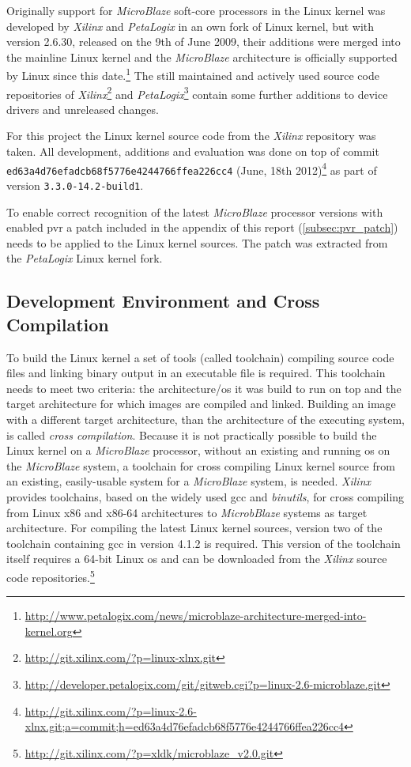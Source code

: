 Originally support for \textit{MicroBlaze} soft-core processors in the Linux kernel was developed by \textit{Xilinx} and \textit{PetaLogix} in an own fork of Linux kernel, but with version 2.6.30, released on the 9th of June 2009, their additions were merged into the mainline Linux kernel and the \textit{MicroBlaze} architecture is officially supported by Linux since this date.\footnote{\url{http://www.petalogix.com/news/microblaze-architecture-merged-into-kernel.org}} The still maintained and actively used source code repositories of \textit{Xilinx}\footnote{\url{http://git.xilinx.com/?p=linux-xlnx.git}} and \textit{PetaLogix}\footnote{\url{http://developer.petalogix.com/git/gitweb.cgi?p=linux-2.6-microblaze.git}} contain some further additions to device drivers and unreleased changes.

For this project the Linux kernel source code from the \textit{Xilinx} repository was taken. All development, additions and evaluation was done on top of commit \texttt{ed63a4d76efadcb68f5776e4244766ffea226cc4} (June, 18th 2012)\footnote{\url{http://git.xilinx.com/?p=linux-2.6-xlnx.git;a=commit;h=ed63a4d76efadcb68f5776e4244766ffea226cc4}} as part of version \texttt{3.3.0-14.2-build1}.

To enable correct recognition of the latest \textit{MicroBlaze} processor versions with enabled \gls{pvr} a patch included in the appendix of this report (\ref{subsec:pvr_patch}) needs to be applied to the Linux kernel sources. The patch was extracted from the \textit{PetaLogix} Linux kernel fork.

\subsection{Development Environment and Cross Compilation}
\label{subsec:sdk}

To build the Linux kernel a set of tools (called toolchain) compiling source code files and linking binary output in an executable file is required. This toolchain needs to meet two criteria: the architecture/\gls{os} it was build to run on top and the target architecture for which images are compiled and linked. Building an image with a different target architecture, than the architecture of the executing system, is called \textit{cross compilation}. Because it is not practically possible to build the Linux kernel on a \textit{MicroBlaze} processor, without an existing and running \gls{os} on the \textit{MicroBlaze} system, a toolchain for cross compiling Linux kernel source from an existing, easily-usable system for a \textit{MicroBlaze} system, is needed. \textit{Xilinx} provides toolchains, based on the widely used \gls{gcc} and \textit{binutils}, for cross compiling from Linux x86 and x86-64 architectures to \textit{MicrobBlaze} systems as target architecture. For compiling the latest Linux kernel sources, version two of the toolchain containing \gls{gcc} in version 4.1.2 is required. This version of the toolchain itself requires a 64-bit Linux \gls{os} and can be downloaded from the \textit{Xilinx} source code repositories.\footnote{\url{http://git.xilinx.com/?p=xldk/microblaze_v2.0.git}}

